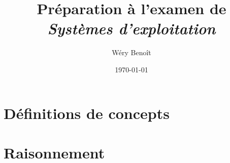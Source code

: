 

\newcommand{\quest}[2]{\textcolor{dkblue}{\textit{#1}}\vspace*{.2cm}\par\hspace*{.5cm}#2}

\newcommand{\vrai}[0]{\textcolor{dkgreen}{Vrai}}
\newcommand{\faux}[0]{\textcolor{dkred}{Faux}}

\author{Wéry Benoît}
\title{Préparation à l'examen de \textit{Systèmes d'exploitation}}
\date{\today}



\maketitle

\chapter{Définitions de concepts}

\begin{enumerate}\setlength\itemsep{1em}





\end{enumerate}


\chapter{Raisonnement}
\begin{enumerate}\setlength\itemsep{1em}


\end{enumerate}





